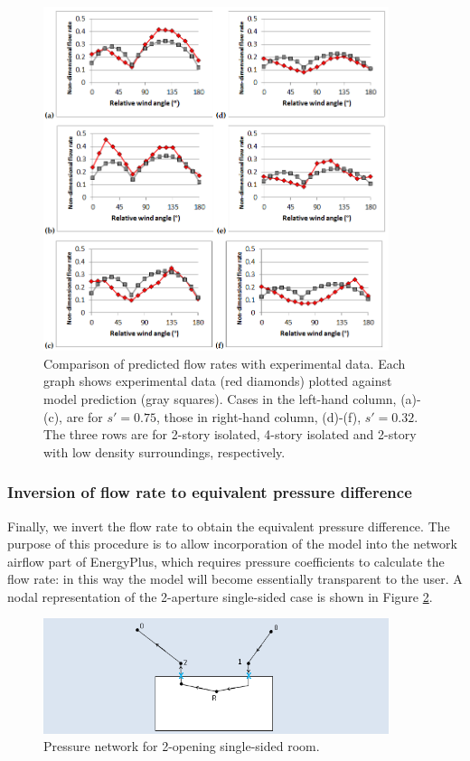\begin{figure}[hbtp] %
\centering
\includegraphics[width=0.9\textwidth, height=0.9\textheight, keepaspectratio=true]{media/ss-figure3.png}
\caption{Comparison of predicted flow rates with experimental data. Each graph shows experimental data (red diamonds) plotted against model prediction (gray squares). Cases in the left-hand column, (a)-(c), are for $s'=0.75$, those in right-hand column, (d)-(f), $s'=0.32$. The three rows are for 2-story isolated, 4-story isolated and 2-story with low density surroundings, respectively. \protect \label{fig:ss-figure-3-in-original}}
\end{figure}

\subsubsection{Inversion of flow rate to equivalent pressure difference}
Finally, we invert the flow rate to obtain the equivalent pressure difference. The purpose of this procedure is to allow incorporation of the model into the network airflow part of EnergyPlus, which requires pressure coefficients to calculate the flow rate: in this way the model will become essentially transparent to the user.
A nodal representation of the 2-aperture single-sided case is shown in Figure \ref{fig:ss-pressure-network-two-openings}.

\begin{figure}[hbtp] %
\centering
\includegraphics[width=0.9\textwidth, height=0.9\textheight, keepaspectratio=true]{media/ss-figure4.png}
\caption{Pressure network for 2-opening single-sided room. \protect \label{fig:ss-pressure-network-two-openings}}
\end{figure}

